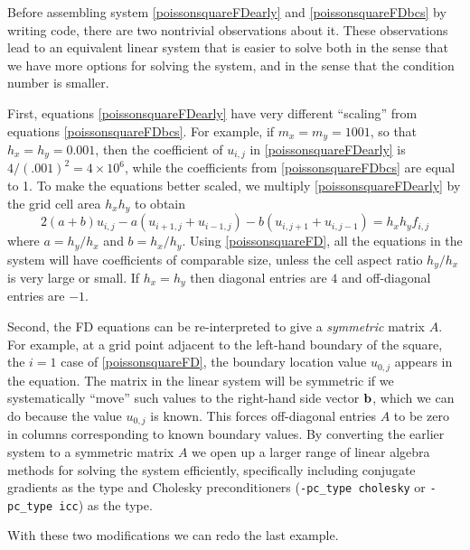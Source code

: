 \medskip
Before assembling system \eqref{poissonsquareFDearly} and \eqref{poissonsquareFDbcs} by writing \PETSc code, there are two nontrivial observations about it.  These observations lead to an equivalent linear system that is easier to solve both in the sense that we have more options for solving the system, and in the sense that the condition number is smaller.

First, equations \eqref{poissonsquareFDearly} have very different ``scaling'' from equations \eqref{poissonsquareFDbcs}.  For example, if $m_x=m_y=1001$, so that $h_x=h_y=0.001$, then the coefficient of $u_{i,j}$ in \eqref{poissonsquareFDearly} is $4/(.001)^2 = 4 \times 10^6$, while the coefficients from \eqref{poissonsquareFDbcs} are equal to 1.  To make the equations better scaled, we multiply \eqref{poissonsquareFDearly} by the grid cell area $h_x h_y$ to obtain
\begin{equation}
2 (a + b) u_{i,j} - a \left(u_{i+1,j} + u_{i-1,j}\right) - b \left(u_{i,j+1} + u_{i,j-1}\right) = h_x h_y f_{i,j} \label{poissonsquareFD}
\end{equation}
where $a=h_y/h_x$ and $b=h_x/h_y$.  Using \eqref{poissonsquareFD}, all the equations in the system will have coefficients of comparable size, unless the cell aspect ratio $h_y/h_x$ is very large or small.  If $h_x=h_y$ then diagonal entries are $4$ and off-diagonal entries are $-1$.

Second, the FD equations can be re-interpreted to give a \emph{symmetric} matrix $A$.  For example, at a grid point adjacent to the left-hand boundary of the square, the $i=1$ case of \eqref{poissonsquareFD}, the boundary location value $u_{0,j}$ appears in the equation.  The matrix in the linear system will be symmetric if we systematically ``move'' such values to the right-hand side vector $\mathbf{b}$, which we can do because the value $u_{0,j}$ is known.  This forces off-diagonal entries $A$ to be zero in columns corresponding to known boundary values.  By converting the earlier system to a symmetric matrix $A$ we open up a larger range of linear algebra methods for solving the system efficiently, specifically including conjugate gradients as the \pKSP type and Cholesky preconditioners (\texttt{-pc\_type cholesky} or \texttt{-pc\_type icc}) as the \pPC type.

With these two modifications we can redo the last example.

